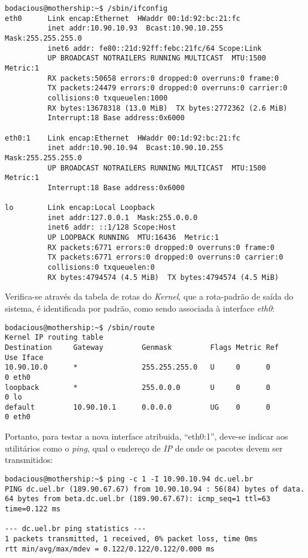 \scriptsize
\begin{verbatim}
bodacious@mothership:~$ /sbin/ifconfig
eth0      Link encap:Ethernet  HWaddr 00:1d:92:bc:21:fc
          inet addr:10.90.10.93  Bcast:10.90.10.255  Mask:255.255.255.0
          inet6 addr: fe80::21d:92ff:febc:21fc/64 Scope:Link
          UP BROADCAST NOTRAILERS RUNNING MULTICAST  MTU:1500  Metric:1
          RX packets:50658 errors:0 dropped:0 overruns:0 frame:0
          TX packets:24479 errors:0 dropped:0 overruns:0 carrier:0
          collisions:0 txqueuelen:1000
          RX bytes:13678318 (13.0 MiB)  TX bytes:2772362 (2.6 MiB)
          Interrupt:18 Base address:0x6000

eth0:1    Link encap:Ethernet  HWaddr 00:1d:92:bc:21:fc
          inet addr:10.90.10.94  Bcast:10.90.10.255  Mask:255.255.255.0
          UP BROADCAST NOTRAILERS RUNNING MULTICAST  MTU:1500  Metric:1
          Interrupt:18 Base address:0x6000

lo        Link encap:Local Loopback
          inet addr:127.0.0.1  Mask:255.0.0.0
          inet6 addr: ::1/128 Scope:Host
          UP LOOPBACK RUNNING  MTU:16436  Metric:1
          RX packets:6771 errors:0 dropped:0 overruns:0 frame:0
          TX packets:6771 errors:0 dropped:0 overruns:0 carrier:0
          collisions:0 txqueuelen:0
          RX bytes:4794574 (4.5 MiB)  TX bytes:4794574 (4.5 MiB)
\end{verbatim}
\normalsize

Verifica-se através da tabela de rotas do \textit{Kernel}, que a rota-padrão de saída do sistema, é identificada por padrão, como sendo associada à interface \textit{eth0}:

\scriptsize
\begin{verbatim}
bodacious@mothership:~$ /sbin/route
Kernel IP routing table
Destination     Gateway         Genmask         Flags Metric Ref    Use Iface
10.90.10.0      *               255.255.255.0   U     0      0        0 eth0
loopback        *               255.0.0.0       U     0      0        0 lo
default         10.90.10.1      0.0.0.0         UG    0      0        0 eth0
\end{verbatim}
\normalsize

Portanto, para testar a nova interface atribuida, ``eth0:1'', deve-se indicar aos utilitários como o \textit{ping}, qual o endereço de \textit{IP} de onde os pacotes devem ser transmitidos:

\scriptsize
\begin{verbatim}
bodacious@mothership:~$ ping -c 1 -I 10.90.10.94 dc.uel.br
PING dc.uel.br (189.90.67.67) from 10.90.10.94 : 56(84) bytes of data.
64 bytes from beta.dc.uel.br (189.90.67.67): icmp_seq=1 ttl=63 time=0.122 ms

--- dc.uel.br ping statistics ---
1 packets transmitted, 1 received, 0% packet loss, time 0ms
rtt min/avg/max/mdev = 0.122/0.122/0.122/0.000 ms
\end{verbatim}
\normalsize


